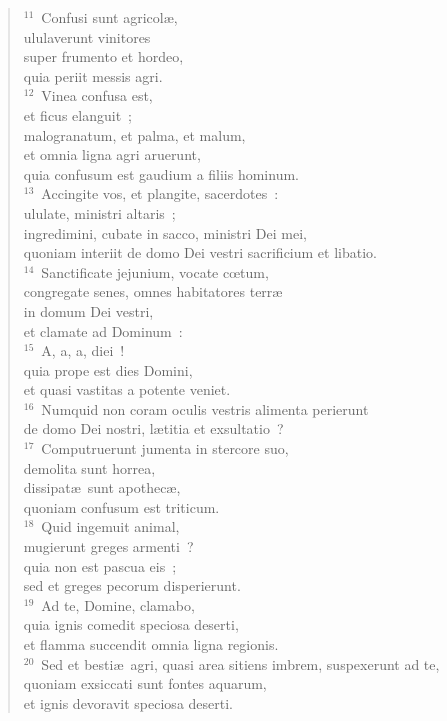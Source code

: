 \begin{flushleft}
\begin{verse}
${}^{11}$~Confusi sunt agricol\ae ,\\ ululaverunt vinitores\\ super frumento et hordeo,\\ quia periit messis agri.\\
${}^{12}$~Vinea confusa est,\\ et ficus elanguit~;\\ malogranatum, et palma, et malum,\\ et omnia ligna agri aruerunt,\\ quia confusum est gaudium a filiis hominum.\\
${}^{13}$~Accingite vos, et plangite, sacerdotes~:\\ ululate, ministri altaris~;\\ ingredimini, cubate in sacco, ministri Dei mei,\\ quoniam interiit de domo Dei vestri sacrificium et libatio.\\
${}^{14}$~Sanctificate jejunium, vocate cœtum,\\ congregate senes, omnes habitatores terr\ae \\ in domum Dei vestri,\\ et clamate ad Dominum~:\\
${}^{15}$~A, a, a, diei~!\\ quia prope est dies Domini,\\ et quasi vastitas a potente veniet.\\
${}^{16}$~Numquid non coram oculis vestris alimenta perierunt\\ de domo Dei nostri, l\ae titia et exsultatio~?\\
${}^{17}$~Computruerunt jumenta in stercore suo,\\ demolita sunt horrea,\\ dissipat\ae\ sunt apothec\ae ,\\ quoniam confusum est triticum.\\
${}^{18}$~Quid ingemuit animal,\\ mugierunt greges armenti~?\\ quia non est pascua eis~;\\ sed et greges pecorum disperierunt.\\
${}^{19}$~Ad te, Domine, clamabo,\\ quia ignis comedit speciosa deserti,\\ et flamma succendit omnia ligna regionis.\\
${}^{20}$~Sed et besti\ae\ agri, quasi area sitiens imbrem, suspexerunt ad te,\\ quoniam exsiccati sunt fontes aquarum,\\ et ignis devoravit speciosa deserti.\end{verse}\end{flushleft}


